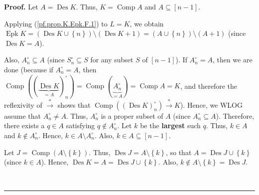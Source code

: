 \documentclass[numbers=enddot,12pt,final,onecolumn,notitlepage]{scrartcl}%
\theoremstyle{definition}
\newenvironment{proof}[1][Proof]{\noindent\textbf{#1.} }{\ \rule{0.5em}{0.5em}}
\newenvironment{verlong}{}{}
\begin{document}
\begin{verlong}
\begin{proof}
Let $A=\operatorname*{Des}K$. Thus, $K=\operatorname*{Comp}A$ and
$A\subseteq\left[  n-1\right]  $.

Applying (\ref{pf.prop.K.Epk.F.1}) to $L=K$, we obtain $\operatorname*{Epk}%
K=\left(  \operatorname*{Des}K\cup\left\{  n\right\}  \right)  \setminus
\left(  \operatorname*{Des}K+1\right)  =\left(  A\cup\left\{  n\right\}
\right)  \setminus\left(  A+1\right)  $ (since $\operatorname*{Des}K=A$).

Also, $A_{n}^{\circ}\subseteq A$ (since $S_{n}^{\circ}\subseteq S$ for any
subset $S$ of $\left[  n-1\right]  $). If $A_{n}^{\circ}=A$, then we are done
(because if $A_{n}^{\circ}=A$, then $\operatorname*{Comp}\left(  \left(
\underbrace{\operatorname*{Des}K}_{=A}\right)  _{n}^{\circ}\right)
=\operatorname*{Comp}\left(  \underbrace{A_{n}^{\circ}}_{=A}\right)
=\operatorname*{Comp}A=K$, and therefore the reflexivity of $\overset{\ast
}{\rightarrow}$ shows that $\operatorname*{Comp}\left(  \left(
\operatorname*{Des}K\right)  _{n}^{\circ}\right)  \overset{\ast}{\rightarrow
}K$). Hence, we WLOG assume that $A_{n}^{\circ}\neq A$. Thus, $A_{n}^{\circ}$
is a proper subset of $A$ (since $A_{n}^{\circ}\subseteq A$). Therefore, there
exists a $q\in A$ satisfying $q\notin A_{n}^{\circ}$. Let $k$ be the
\textbf{largest} such $q$. Thus, $k\in A$ and $k\notin A_{n}^{\circ}$. Hence,
$k\in A\setminus A_{n}^{\circ}$. Also, $k\in A\subseteq\left[  n-1\right]  $.

Let $J=\operatorname*{Comp}\left(  A\setminus\left\{  k\right\}  \right)  $.
Thus, $\operatorname*{Des}J=A\setminus\left\{  k\right\}  $, so that
$A=\operatorname*{Des}J\cup\left\{  k\right\}  $ (since $k\in A$). Hence,
$\operatorname*{Des}K=A=\operatorname*{Des}J\cup\left\{  k\right\}  $. Also,
$k\notin A\setminus\left\{  k\right\}  =\operatorname*{Des}J$.


\end{proof}
\end{verlong}
\end{document}
